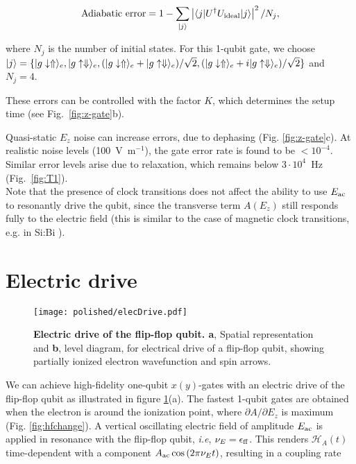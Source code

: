\begin{equation}\label{eq:adError}
{\rm Adiabatic~error}=1-\sum\limits_{|j\rangle}{\left|\langle j|U^\dagger U_{\rm ideal}|j\rangle\right|^2/N_j},
\end{equation}

where $N_j$ is the number of initial states. For this 1-qubit gate, we choose $|j\rangle=\{|g\downarrow\Uparrow\rangle_e,|g\uparrow\Downarrow\rangle_e,(|g\downarrow\Uparrow\rangle_e+|g\uparrow\Downarrow\rangle_e)/\sqrt{2},(|g\downarrow\Uparrow\rangle_e+i|g\uparrow\Downarrow\rangle_e)/\sqrt{2}\}$ and $N_j=4$. 

These errors can be controlled with the factor $K$, which determines the setup time (see Fig.~\ref{fig:z-gate}b).

Quasi-static $E_z$ noise can increase errors, due to dephasing (Fig. \ref{fig:z-gate}c). At realistic noise levels (100~V~m$^{-1}$), the gate error rate is found to be $<10^{-4}$. Similar error levels arise due to relaxation, which remains below $3\cdot 10^4$~Hz (Fig.~\ref{fig:T1}).\\

Note that the presence of clock transitions does not affect the ability to use $E_{\rm ac}$ to resonantly drive the qubit, since the transverse term $A(E_z)$ still responds fully to the electric field (this is similar to the case of magnetic clock transitions, e.g. in Si:Bi \cite{Wolfowicz2013}).


\section{Electric drive}

\begin{figure}[h]
	\centering
	\texttt{[image: polished/elecDrive.pdf]}
	\caption[Electric drive of the flip-flop qubit]{\textbf{Electric drive of the flip-flop qubit. a}, Spatial representation and \textbf{b}, level diagram, for electrical drive of a flip-flop qubit, showing partially ionized electron wavefunction and spin arrows.}
		\label{fig:elec_drive}
\end{figure}


We can achieve high-fidelity one-qubit $x(y)$-gates with an electric drive of the flip-flop qubit as illustrated in figure \ref{fig:elec_drive}(a).  The fastest 1-qubit gates are obtained when the electron is around the ionization point, where $\partial A/\partial E_z$ is maximum (Fig. \ref{fig:hfchange}). A vertical oscillating electric field of amplitude $E_{\rm ac}$ is applied in resonance with the flip-flop qubit, \textit{i.e}, $\nu_E=\epsilon_{\rm ff}$. This renders $\mathcal{H}_A(t)$ time-dependent with a component $A_{\rm ac}\cos{\left(2\pi\nu_E t\right)}$, resulting in a coupling rate

